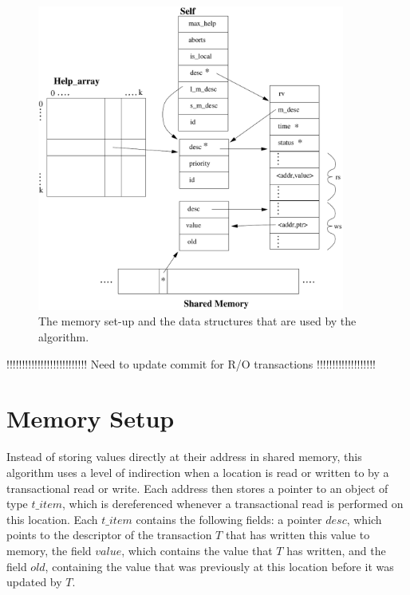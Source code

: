 \documentclass[runningheads,a4paper]{llncs}
\begin{document}
 
 
 
 

\begin{figure}[ht]
\centerline{
    \mbox{\includegraphics[width=0.9\textwidth]{stuff}}
}
\caption{The memory set-up and the data structures that are used by the 
algorithm.}
\label{fig:mem_setup}
\end{figure}
 
 !!!!!!!!!!!!!!!!!!!!!!!!!! Need to update commit for R/O transactions !!!!!!!!!!!!!!!!!!!
 
\section{Memory Setup}
Instead of storing values directly at their address in shared memory, this algorithm
uses a level of indirection when a location is read or written to by a transactional read or write.
Each address then stores a pointer to an object of type $t\_item$, which is dereferenced
whenever a transactional read is performed on this location.
Each $\mathit{t\_item}$ contains the following fields:
a pointer $\mathit{desc}$, which points to the descriptor of the transaction $T$ that has written
this value to memory,
the field $\mathit{value}$, which contains the value that $T$ has written,
and the field $\mathit{old}$, containing the value that was previously at this location before
it was updated by $T$.
\end{document}
